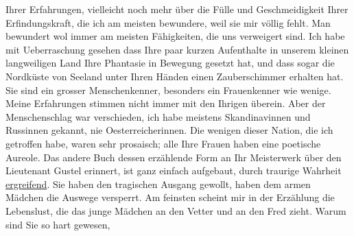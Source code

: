 \begin{ledgroupsized}[t]{13cm}
               Ihrer Erfahrungen, vielleicht noch mehr über die Fülle und Geschmeidigkeit Ihrer
               Erfindungskraft, die ich am meisten bewundere, weil sie mir völlig fehlt. Man
               bewundert {\pb}wol immer am meisten
               Fähigkeiten, die uns verweigert sind.\pend
           \pstart
           Ich habe mit Ueberraschung gesehen dass Ihre paar kurzen Aufenthalte in unserem
               kleinen langweiligen Land
               Ihre Phantasie in Bewegung gesetzt hat, und dass sogar die Nordküste von Seeland unter Ihren Händen einen Zauberschimmer erhalten hat.\pend
           \pstart
           Sie sind ein grosser Menschenkenner, besonders ein Frauenkenner wie wenige. Meine
               Erfahrungen stimmen nicht immer mit den Ihrigen überein. Aber der Menschenschlag war
               verschieden, ich habe meistens Skandinavinnen und
                  Russinnen gekannt, nie Oesterreicherinnen. Die wenigen dieser Nation, die ich getroffen
               habe, waren sehr prosaisch; alle Ihre Frauen haben eine poetische Aureole.\pend
           \pstart
           Das andere Buch dessen
               erzählende Form an Ihr Meisterwerk über den {\pb}Lieutenant Gustel erinnert, ist ganz einfach
               aufgebaut, durch traurige Wahrheit \uline{ergreifend}. Sie
               haben den tragischen Ausgang gewollt, haben dem armen Mädchen die Auswege versperrt.
               Am feinsten scheint mir in der Erzählung die Lebenslust, die das junge Mädchen an den Vetter und an den Fred zieht. Warum sind Sie so hart gewesen,

\end{ledgroupsized}
